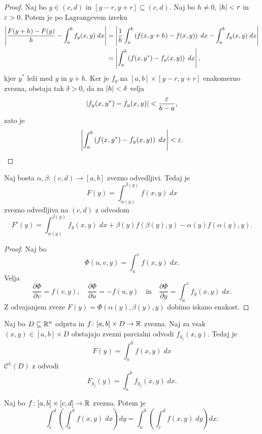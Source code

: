 \begin{proof}
Naj bo $y \in (c,d)$ in $[y-r,y+r] \subseteq (c,d)$. Naj bo
$h \ne 0$, $\left\lvert h\right\rvert < r$ in $\varepsilon > 0$. Potem je po
Lagrangevem izreku
\begin{align*}
\left\lvert \frac{F(y+h) - F(y)}{h} - \int_a^b f_y(x,y)\;dx\right\rvert &=
\left\lvert \frac{1}{h} \int_a^b \left(f(x,y+h) - f(x,y)\right)\;dx -
\int_a^b f_y(x,y)\;dx\right\rvert
\\
&= \left\lvert \int_a^b \left(f(x,y^*) - f_y(x,y)\right)\;dx\right\rvert,
\end{align*}
kjer $y^*$ leži med $y$ in $y+h$. Ker je $f_y$ na
$[a,b] \times [y-r,y+r]$ enakomerno zvezna, obstaja tak
$\delta > 0$, da za $\left\lvert h\right\rvert < \delta$ velja
\[
\left\lvert f_y(x,y^*) - f_y(x,y)\right\rvert < \frac{\varepsilon}{b-a},
\]
zato je
\[
\left\lvert \int_a^b \left(f(x,y^*) - f_y(x,y)\right)\;dx\right\rvert < \varepsilon.
\qedhere
\]
\end{proof}

\begin{posledica}
Naj bosta $\alpha,\beta \colon (c,d) \to [a,b]$ zvezno odvedljivi.
Tedaj je
\[
F(y) = \int_{\alpha(y)}^{\beta(y)} f(x,y)\;dx
\]
zvezno odvedljiva na $(c,d)$ z odvodom
\[
F'(y) = \int_{\alpha(y)}^{\beta(y)} f_y(x,y)\;dx +
\beta(y) f(\beta(y),y) - \alpha(y) f(\alpha(y),y).
\]
\end{posledica}

\begin{proof}
Naj bo
\[
\Phi(u,v,y) = \int_u^v f(x,y)\;dx.
\]
Velja
\[
\frac{\partial \Phi}{\partial v} = f(v,y),
\quad
\frac{\partial \Phi}{\partial u} = -f(u,y)
\quad \text{in} \quad
\frac{\partial \Phi}{\partial y} = \int_u^v f_y(x,y)\;dx.
\]
Z odvajanjem zveze $F(y) = \Phi(\alpha(y),\beta(y),y)$ dobimo
iskano enakost.
\end{proof}

\begin{posledica}
Naj bo $D \subseteq \mathbb{R}^n$ odprta in
$f \colon [a,b] \times D \to \mathbb{R}$ zvezna. Naj za vsak
$(x,y) \in [a,b] \times D$ obstajajo zvezni parcialni odvodi
$f_{y_j}(x,y)$. Tedaj je
\[
F(y) = \int_a^b f(x,y)\;dx
\]
$\mathcal{C}^1(D)$ z odvodi
\[
F_{y_j}(y) =  \int_a^b f_{y_j}(x,y)\;dx.
\]
\end{posledica}


\begin{izrek}[Fubini]\label{iz:fub1}
Naj bo $f \colon [a,b] \times [c,d] \to \mathbb{R}$ zvezna. Potem je
\[
\int_c^d \left(\int_a^b f(x,y)\;dx\right) dy =
\int_a^b \left(\int_c^d f(x,y)\;dy\right) dx.
\]
\end{izrek}

